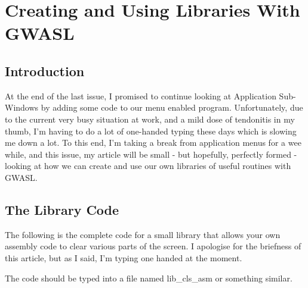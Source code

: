 \chapter{Creating and Using Libraries With GWASL}

\section{Introduction}
\label{ch30-intro}%

At the end of the last issue, I promised to continue looking at
    Application Sub-{}Windows by adding some code to our menu enabled program.
    Unfortunately, due to the current very busy situation at work, and a mild
    dose of tendonitis in my thumb, I'm having to do a lot of one-{}handed
    typing these days which is slowing me down a lot. To this end, I'm taking
    a break from application menus for a wee while, and this issue, my article
    will be small -{} but hopefully, perfectly formed -{} looking at how we can
    create and use our own libraries of useful routines with
 GWASL.

\section{The Library Code}
\label{ch30-app-menu-code}%

The following is the complete code for a small library that allows
    your own assembly code to clear various parts of the screen. I apologise
    for the briefness of this article, but as I said, I'm typing one handed at
    the moment.

The code should be typed into a file named
 lib\_cls\_asm or something similar.


